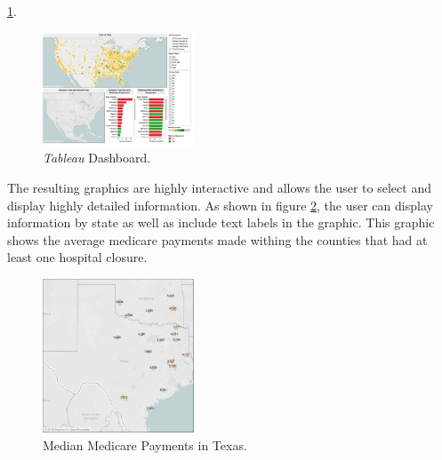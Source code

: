 \documentclass[10pt,conference]{IEEEtran}
\begin{document}
\ref{dashboard}.
\begin{figure}[htbp]
\begin{center}
\includegraphics[width=0.4\textwidth]{Dashboard.png}
\caption{\emph{Tableau} Dashboard.}
\label{dashboard} 
\end{center}
\end{figure}
The resulting graphics are highly interactive and allows the user to select and display highly detailed information. As shown in figure \ref{Texas_Figure}, the user can display information by state as well as include text labels in the graphic. This graphic shows the average medicare payments made withing the counties that had at least one hospital closure.

\begin{figure}[htbp]
\begin{center}
\includegraphics[width=0.4\textwidth]{MEDIAN_MED_PMT.png}
\caption{Median Medicare Payments in Texas.}
\label{Texas_Figure} 
\end{center}
\end{figure}
\end{document}
